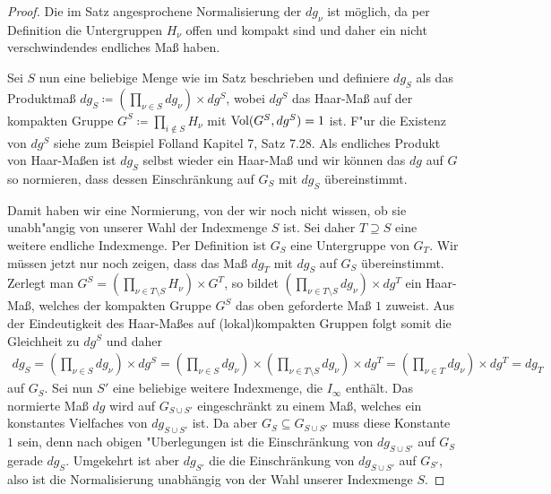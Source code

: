 		\begin{proof}
			Die im Satz angesprochene Normalisierung der $dg_\nu$ ist möglich, da per Definition die Untergruppen $H_\nu$ offen und kompakt sind und daher ein nicht verschwindendes endliches Maß haben.
			
			Sei $S$ nun eine beliebige Menge wie im Satz beschrieben und definiere $dg_S$ als das Produktmaß $dg_S \coloneqq \left(\prod_{\nu \in S}dg_\nu\right) \times dg^S$, wobei $dg^S$ das Haar-Maß auf der kompakten Gruppe $G^S\coloneqq \prod_{i \notin S} H_\nu$ mit $\text{Vol}(G^S, dg^S) = 1$ ist. 
			F"ur die Existenz von $dg^S$ siehe zum Beispiel Folland \cite{folland} Kapitel 7, Satz 7.28. 
			Als endliches Produkt von Haar-Maßen ist $dg_S$ selbst wieder ein Haar-Maß und wir können das $dg$ auf $G$ so normieren, dass dessen Einschränkung auf $G_S$ mit $dg_S$ übereinstimmt.
			
			Damit haben wir eine Normierung, von der wir noch nicht wissen, ob sie unabh"angig von unserer Wahl der Indexmenge $S$ ist.
			Sei daher $T\supseteq S$ eine weitere endliche Indexmenge. 
			Per Definition ist $G_S$ eine Untergruppe von $G_T$. 
			Wir müssen jetzt nur noch zeigen, dass das Maß $dg_T$ mit $dg_S$ auf $G_S$  übereinstimmt.
			Zerlegt man $G^S = \left(\prod_{\nu\in T \setminus S} H_\nu\right) \times G^T$, so bildet $\left(\prod_{\nu\in T \setminus S} dg_\nu\right) \times dg^T$ ein Haar-Maß, welches der kompakten Gruppe $G^S$ das oben geforderte Maß $1$ zuweist.
			Aus der Eindeutigkeit des Haar-Maßes auf (lokal)kompakten Gruppen folgt somit die Gleichheit zu $dg^S$ und daher
			\begin{align*}
				dg_S 
					= \left(\prod_{\nu \in S}dg_\nu\right) \times dg^S 
					= \left(\prod_{\nu \in S}dg_\nu\right) \times \left(\prod_{\nu\in T \setminus S} dg_\nu\right) \times dg^T
					= \left(\prod_{\nu \in T}dg_\nu\right) \times dg^T = dg_T
			\end{align*}
			auf $G_S$. Sei nun $S'$ eine beliebige weitere Indexmenge, die $I_\infty$ enthält. 
			Das normierte Maß $dg$ wird auf $G_{S\cup S'}$ eingeschränkt zu einem Maß, welches ein konstantes Vielfaches von $dg_{S\cup S'}$ ist. 
			Da aber $G_S \subseteq G_{S\cup S'}$ muss diese Konstante $1$ sein, denn nach obigen "Uberlegungen ist die Einschränkung von $dg_{S\cup S'}$ auf $G_S$ gerade $dg_{S}$.
			Umgekehrt ist aber $dg_{S'}$ die die Einschränkung von $dg_{S\cup S'}$ auf $G_{S'}$, also ist die Normalisierung unabhängig von der Wahl unserer Indexmenge $S$.
		\end{proof}
